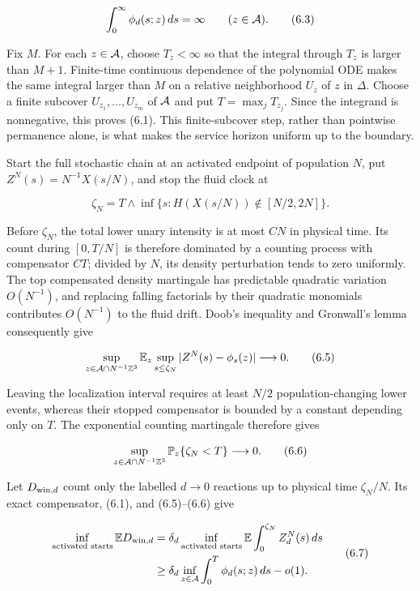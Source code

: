 \[
                \int_0^\infty \phi_d(s;z)\,ds=\infty
                    \qquad(z\in{\cal A}).            \tag{6.3}
\]

Fix \(M\). For each \(z\in{\cal A}\), choose \(T_z<\infty\) so that the
integral through \(T_z\) is larger than \(M+1\). Finite-time continuous
dependence of the polynomial ODE makes the same integral larger than
\(M\) on a relative neighborhood \(U_z\) of \(z\) in \(\Delta\). Choose
a finite subcover \(U_{z_1},\ldots,U_{z_m}\) of \({\cal A}\) and put
\(T=\max_jT_{z_j}\). Since the integrand is nonnegative, this proves
(6.1). This finite-subcover step, rather than pointwise permanence
alone, is what makes the service horizon uniform up to the boundary.

Start the full stochastic chain at an activated endpoint of population
\(N\), put \(Z^N(s)=N^{-1}X(s/N)\), and stop the fluid clock at

\[
 \zeta_N=T\wedge\inf\{s:H(X(s/N))\notin[N/2,2N]\}.  \tag{6.4}
\]

Before \(\zeta_N\), the total lower unary intensity is at most \(C N\)
in physical time. Its count during \([0,T/N]\) is therefore dominated by
a counting process with compensator \(CT\); divided by \(N\), its
density perturbation tends to zero uniformly. The top compensated
density martingale has predictable quadratic variation \(O(N^{-1})\),
and replacing falling factorials by their quadratic monomials
contributes \(O(N^{-1})\) to the fluid drift. Doob's inequality and
Gronwall's lemma consequently give

\[
 \sup_{z\in{\cal A}\cap N^{-1}{\mathbb Z}^3}
 \mathbb E_z\sup_{s\le\zeta_N}
       |Z^N(s)-\phi_s(z)|\longrightarrow0.           \tag{6.5}
\]

Leaving the localization interval requires at least \(N/2\)
population-changing lower events, whereas their stopped compensator is
bounded by a constant depending only on \(T\). The exponential counting
martingale therefore gives

\[
 \sup_{z\in{\cal A}\cap N^{-1}{\mathbb Z}^3}
       \mathbb P_z\{\zeta_N<T\}\longrightarrow0.     \tag{6.6}
\]

Let \(D_{{\rm win},d}\) count only the labelled \(d\to0\) reactions up
to physical time \(\zeta_N/N\). Its exact compensator, (6.1), and
(6.5)--(6.6) give

\[
 \begin{aligned}
 \inf_{\text{activated starts}}\mathbb E D_{{\rm win},d}
 &=\delta_d\inf_{\text{activated starts}}
       \mathbb E\int_0^{\zeta_N}Z_d^N(s)\,ds\\
 &\ge \delta_d\inf_{z\in{\cal A}}
                    \int_0^T\phi_d(s;z)\,ds-o(1).
 \end{aligned}
                                                               \tag{6.7}
\]

